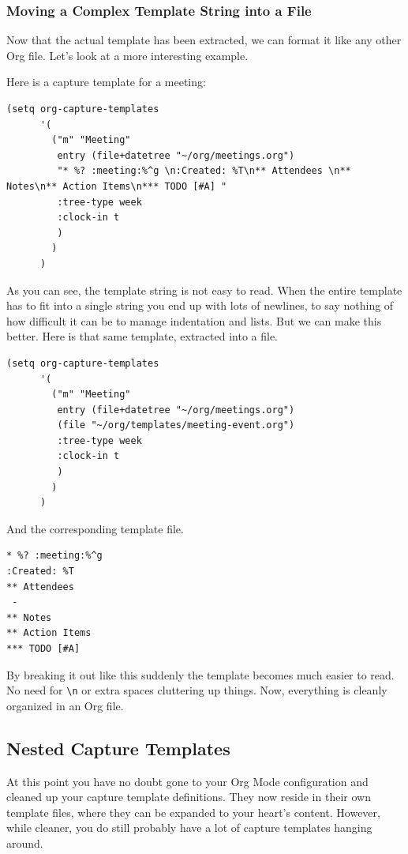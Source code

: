 \documentclass[11pt]{article}
\begin{document}
\subsubsection*{Moving a Complex Template String into a File}
\label{sec:org02111f7}
Now that the actual template has been extracted, we can format it like any other Org file. Let's look at a more interesting example.

Here is a capture template for a meeting:

\begin{verbatim}
(setq org-capture-templates
      '(
        ("m" "Meeting"
         entry (file+datetree "~/org/meetings.org")
         "* %? :meeting:%^g \n:Created: %T\n** Attendees \n** Notes\n** Action Items\n*** TODO [#A] "
         :tree-type week
         :clock-in t
         )
        )
      )
\end{verbatim}

As you can see, the template string is not easy to read. When the entire template has to fit into a single string you end up with lots of newlines, to say nothing of how difficult it can be to manage indentation and lists. But we can make this better. Here is that same template, extracted into a file.

\begin{verbatim}
(setq org-capture-templates
      '(
        ("m" "Meeting"
         entry (file+datetree "~/org/meetings.org")
         (file "~/org/templates/meeting-event.org")
         :tree-type week
         :clock-in t
         )
        )
      )
\end{verbatim}

And the corresponding template file.

\begin{verbatim}
* %? :meeting:%^g
:Created: %T
** Attendees
 -
** Notes
** Action Items
*** TODO [#A]
\end{verbatim}

By breaking it out like this suddenly the template becomes much easier to read. No need for \texttt{\textbackslash{}n} or extra spaces cluttering up things. Now, everything is cleanly organized in an Org file.
\subsection*{Nested Capture Templates}
\label{sec:org646018f}
At this point you have no doubt gone to your Org Mode configuration and cleaned up your capture template definitions. They now reside in their own template files, where they can be expanded to your heart's content. However, while cleaner, you do still probably have a lot of capture templates hanging around.
\end{document}
